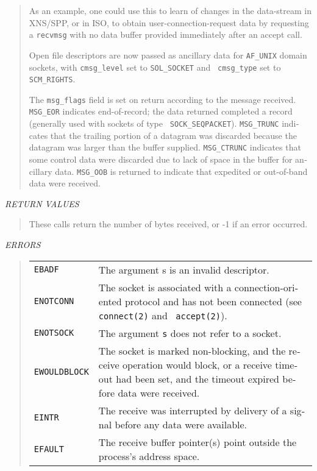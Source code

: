 \begin{appendix}
\begin{english}
\begin{quote}
	As an example, one could use this to learn of changes in the
	data-stream in XNS/SPP, or in ISO, to obtain user-connection-request
	data by requesting a {\tt recvmsg} with no data buffer provided
	immediately after an accept call.

	Open file descriptors are now passed as ancillary data for {\tt AF\_UNIX}
	domain sockets, with {\tt cmsg\_level} set to {\tt SOL\_SOCKET} and {\tt
	cmsg\_type} set to {\tt SCM\_RIGHTS}.

	The {\tt msg\_flags} field is set on return according to the message
	received. {\tt MSG\_EOR} indicates end-of-record; the data returned
	completed a record (generally used with sockets of type {\tt
	SOCK\_SEQPACKET}). {\tt MSG\_TRUNC} indicates that the trailing
	portion of a datagram was discarded because the datagram was larger
	than the buffer supplied. {\tt MSG\_CTRUNC} indicates that some
	control data were discarded due to lack of space in the buffer for
	ancillary data. {\tt MSG\_OOB} is returned to indicate that
	expedited or out-of-band data were received.
\end{quote}

{\sl RETURN VALUES}
\begin{quote}
 	These calls return the number of bytes received, or -1 if
 	an error occurred.
\end{quote}

{\sl ERRORS}
\begin{quote}
\begin{tabular}{lp{8cm}}
	{\tt EBADF} &
		The argument s is an invalid descriptor.\\
	{\tt ENOTCONN} &
		The socket is associated with a connection-oriented protocol
		and has not been connected (see {\tt connect(2)} and {\tt
accept(2)}).\\

	{\tt ENOTSOCK} &
		The argument {\tt s} does not refer to a socket.\\
	{\tt EWOULDBLOCK} &
		The socket is marked non-blocking, and the receive
		operation would block, or a receive timeout had
		been set, and the timeout expired before data were
		received.\\
	{\tt EINTR} &
		The receive was interrupted by delivery of a signal before any data
		were available.\\
	{\tt EFAULT} &
		The receive buffer pointer(s) point outside the process's address
space.
\end{tabular}
\end{quote}


\end{english}
\end{appendix}
